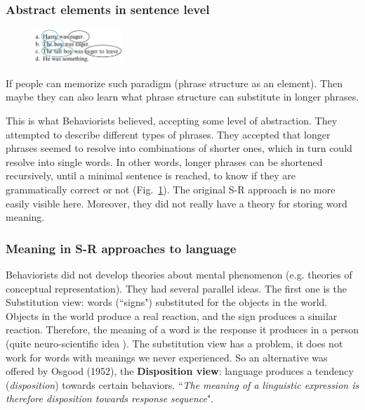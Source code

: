 \subsubsection{Abstract elements in sentence level}

\begin{figure}
  \centering
  \includegraphics[width=0.3\textwidth]{images/elements.png}
  \caption{}
  \label{fig:elements}
\end{figure}
If people can memorize such paradigm (phrase structure as an element). Then maybe they can also learn what phrase structure can substitute in longer phrases.

This is what Behaviorists believed, accepting some level of abstraction. They attempted to describe different types of phrases. They accepted that longer phrases seemed to resolve into combinations of shorter ones, which in turn could resolve into single words. In other words, longer phrases can be shortened recursively, until a minimal sentence is reached, to know if they are grammatically correct or not (Fig.~\ref{fig:elements}).
The original S-R approach is no more easily visible here.
Moreover, they did not really have a theory for storing word meaning.

\subsubsection{Meaning in S-R approaches to language}
Behaviorists did not develop theories about mental phenomenon (e.g. theories of conceptual representation). They had several parallel ideas.
The first one is the {Substitution view}: words (``signs") substituted for the objects in the world. Objects in the world produce a real reaction, and the sign produces a similar reaction.  Therefore, the meaning of a word is the response it produces in a person (quite neuro-scientific idea \notet). The substitution view has a problem, it does not work for words with meanings we never experienced. So an alternative was offered by Osgood (1952), the \textbf{Disposition view}: language produces a tendency (\textit{disposition}) towards certain behaviors. ``\textit{The meaning of a linguistic expression is therefore disposition towards response sequence}".


